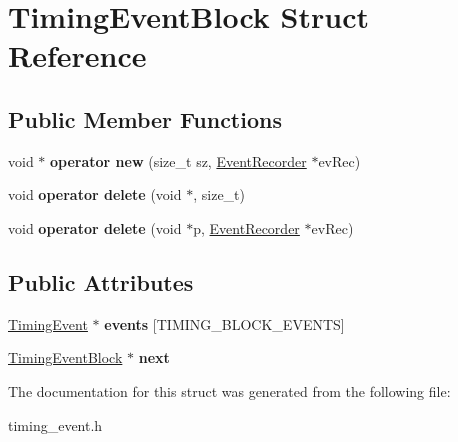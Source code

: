 \hypertarget{structTimingEventBlock}{\section{Timing\-Event\-Block Struct Reference}
\label{structTimingEventBlock}
}
\subsection*{Public Member Functions}
\begin{DoxyCompactItemize}
\item 
\hypertarget{structTimingEventBlock_a2893419c89b441b7eeac01931b46eb69}{void $\ast$ {\bfseries operator new} (size\-\_\-t sz, \hyperlink{classEventRecorder}{Event\-Recorder} $\ast$ev\-Rec)}\label{structTimingEventBlock_a2893419c89b441b7eeac01931b46eb69}

\item 
\hypertarget{structTimingEventBlock_a0e4e04137d8058df35f3de8a2d8f3909}{void {\bfseries operator delete} (void $\ast$, size\-\_\-t)}\label{structTimingEventBlock_a0e4e04137d8058df35f3de8a2d8f3909}

\item 
\hypertarget{structTimingEventBlock_a04d19b0eb1e02fb4d472c46ced7a2288}{void {\bfseries operator delete} (void $\ast$p, \hyperlink{classEventRecorder}{Event\-Recorder} $\ast$ev\-Rec)}\label{structTimingEventBlock_a04d19b0eb1e02fb4d472c46ced7a2288}

\end{DoxyCompactItemize}
\subsection*{Public Attributes}
\begin{DoxyCompactItemize}
\item 
\hypertarget{structTimingEventBlock_a98af02d1ac96b4d5711a4d548e988087}{\hyperlink{classTimingEvent}{Timing\-Event} $\ast$ {\bfseries events} \mbox{[}T\-I\-M\-I\-N\-G\-\_\-\-B\-L\-O\-C\-K\-\_\-\-E\-V\-E\-N\-T\-S\mbox{]}}\label{structTimingEventBlock_a98af02d1ac96b4d5711a4d548e988087}

\item 
\hypertarget{structTimingEventBlock_a3b94413d038496e3e351f5bc70f23c0a}{\hyperlink{structTimingEventBlock}{Timing\-Event\-Block} $\ast$ {\bfseries next}}\label{structTimingEventBlock_a3b94413d038496e3e351f5bc70f23c0a}

\end{DoxyCompactItemize}


The documentation for this struct was generated from the following file\-:\begin{DoxyCompactItemize}
\item 
timing\-\_\-event.\-h\end{DoxyCompactItemize}

